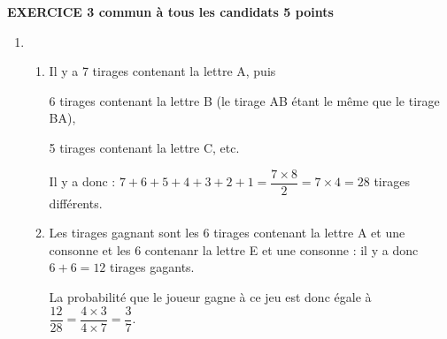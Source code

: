\textbf{EXERCICE 3 commun à tous les candidats \hfill 5 points}

\medskip

%
%
%

\begin{enumerate}
\item %
	\begin{enumerate}
		\item %
Il y a 7 tirages contenant la lettre A, puis 

6 tirages contenant la lettre B (le tirage AB étant le même que le tirage BA), 

5 tirages contenant la lettre C, etc.

Il y a donc : $7 + 6 + 5 + 4 + 3 + 2 + 1 = \dfrac{7 \times 8}{2}= 7 \times 4 = 28$ tirages différents.
		\item %
Les tirages gagnant sont les 6 tirages contenant la lettre A et une consonne et les 6 contenanr la lettre E et une consonne : il y a donc $6 + 6 = 12$ tirages gagants.

La probabilité que le joueur gagne à ce jeu est donc égale à $\dfrac{12}{28} = \dfrac{4\times 3}{4 \times 7} = \dfrac{3}{7}$.
	\end{enumerate}
\end{enumerate}
	
%

